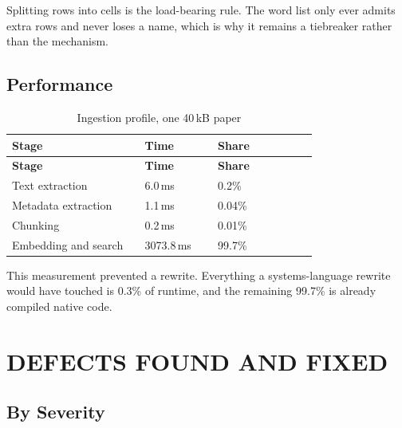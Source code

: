 \documentclass[12pt,a4paper]{report}
\begin{document}
Splitting rows into cells is the load-bearing rule. The word list only ever
admits extra rows and never loses a name, which is why it remains a tiebreaker
rather than the mechanism.

\section{Performance}

\begin{longtable}{@{}p{0.40\linewidth}p{0.22\linewidth}p{0.30\linewidth}@{}}
\caption{Ingestion profile, one 40\,kB paper}\label{tab:perf}\\
\toprule
\textbf{Stage} & \textbf{Time} & \textbf{Share} \\
\midrule
\endfirsthead
\toprule
\textbf{Stage} & \textbf{Time} & \textbf{Share} \\
\midrule
\endhead

Text extraction        & 6.0\,ms    & 0.2\% \\
Metadata extraction    & 1.1\,ms    & 0.04\% \\
Chunking               & 0.2\,ms    & 0.01\% \\
Embedding and search   & 3073.8\,ms & 99.7\% \\
\bottomrule
\end{longtable}

This measurement prevented a rewrite. Everything a systems-language rewrite
would have touched is 0.3\% of runtime, and the remaining 99.7\% is already
compiled native code.

\chapter{DEFECTS FOUND AND FIXED}

\section{By Severity}\label{sec:defects}
\end{document}
